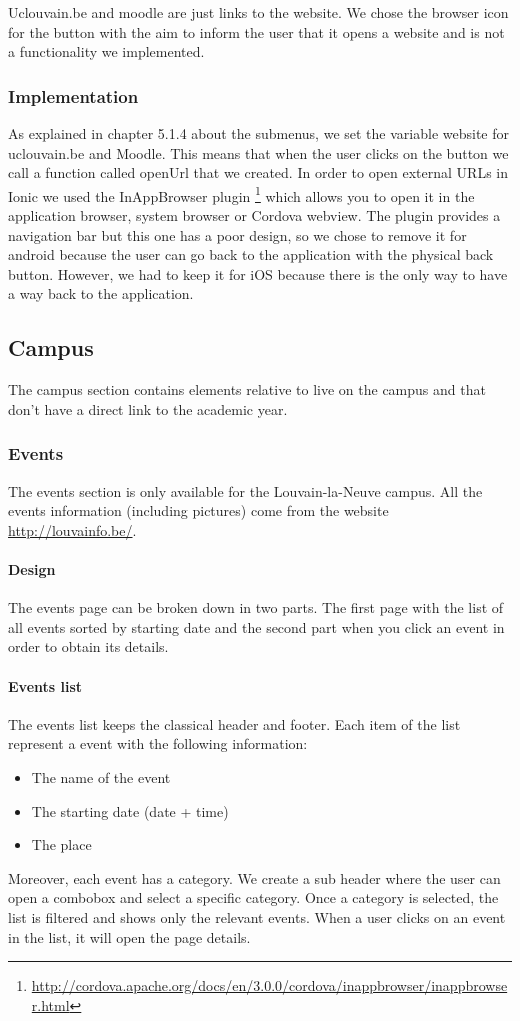 \documentclass{eplmastersthesis}
\begin{document}
Uclouvain.be and moodle are just links to the website. We chose the browser icon for the button with the aim to inform the user that it opens a website and is not a functionality we implemented. 
\subsubsection{Implementation}
As explained in chapter 5.1.4 about the submenus, we set the variable website for uclouvain.be and Moodle. This means that when the user clicks on the button we call a function called openUrl that we created. In order to open external URLs in Ionic we used the InAppBrowser plugin \footnote{\url{http://cordova.apache.org/docs/en/3.0.0/cordova/inappbrowser/inappbrowser.html}} which allows you to open it in the application browser, system browser or Cordova webview. The plugin provides a navigation bar but this one has a poor design, so we chose to remove it for android because the user can go back to the application with the physical back button. However, we had to keep it for iOS because there is the only way to have a way back to the application. 

\subsection{Campus}
The campus section contains elements relative to live on the campus and that don't have a direct link to the academic year. 

\subsubsection{Events}
The events section is only available for the Louvain-la-Neuve campus. All the events information (including pictures) come from the website \url{http://louvainfo.be/}.
\paragraph{Design}
The events page can be broken down in two parts. The first page with the list of all events sorted by starting date and the second part when you click an event in order to obtain its details. 
\paragraph{Events list}
The events list keeps the classical header and footer. Each item of the list represent a event with the following information:
\begin{itemize}
\item The name of the event
\item The starting date (date + time)
\item The place
\end{itemize}
Moreover, each event has a category. We create a sub header where the user can open a combobox and select a specific category. Once a category is selected, the list is filtered and shows only the relevant events. When a user clicks on an event in the list, it will open the page details.
\end{document}
